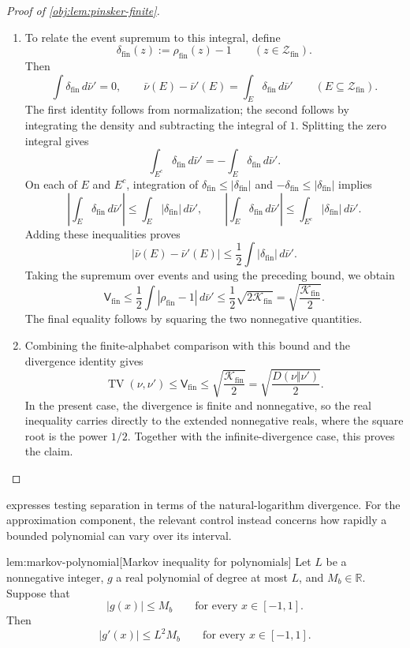 \documentclass[11pt]{article}
\begin{document}
\begin{proof}[Proof of \cref{obj:lem:pinsker-finite}]
\begin{enumerate}
\item To relate the event supremum to this integral, define
\[
\delta_{\mathrm{fin}}(z):=\rho_{\mathrm{fin}}(z)-1
\qquad(z\in\mathcal Z_{\mathrm{fin}}).
\]
Then
\[
\int\delta_{\mathrm{fin}}\,d\bar\nu'=0,
\qquad
\bar\nu(E)-\bar\nu'(E)
=\int_E\delta_{\mathrm{fin}}\,d\bar\nu'
\qquad(E\subseteq\mathcal Z_{\mathrm{fin}}).
\]
The first identity follows from normalization; the second follows by integrating the density and subtracting the integral of \(1\). Splitting the zero integral gives
\[
\int_{E^c}\delta_{\mathrm{fin}}\,d\bar\nu'
=-\int_E\delta_{\mathrm{fin}}\,d\bar\nu'.
\]
On each of \(E\) and \(E^c\), integration of
\(\delta_{\mathrm{fin}}\le|\delta_{\mathrm{fin}}|\) and
\(-\delta_{\mathrm{fin}}\le|\delta_{\mathrm{fin}}|\) implies
\[
\left|\int_E\delta_{\mathrm{fin}}\,d\bar\nu'\right|
\le\int_E|\delta_{\mathrm{fin}}|\,d\bar\nu',
\qquad
\left|\int_E\delta_{\mathrm{fin}}\,d\bar\nu'\right|
\le\int_{E^c}|\delta_{\mathrm{fin}}|\,d\bar\nu'.
\]
Adding these inequalities proves
\[
|\bar\nu(E)-\bar\nu'(E)|
\le\frac12\int|\delta_{\mathrm{fin}}|\,d\bar\nu'.
\]
Taking the supremum over events and using the preceding bound, we obtain
\[
\mathsf V_{\mathrm{fin}}
\le\frac12\int|\rho_{\mathrm{fin}}-1|\,d\bar\nu'
\le\frac12\sqrt{2\mathcal K_{\mathrm{fin}}}
=\sqrt{\frac{\mathcal K_{\mathrm{fin}}}{2}}.
\]
The final equality follows by squaring the two nonnegative quantities.

\item Combining the finite-alphabet comparison with this bound and the divergence identity gives
\[
\operatorname{TV}(\nu,\nu')
\le\mathsf V_{\mathrm{fin}}
\le\sqrt{\frac{\mathcal K_{\mathrm{fin}}}{2}}
=\sqrt{\frac{D(\nu\Vert\nu')}{2}}.
\]
In the present case, the divergence is finite and nonnegative, so the real inequality carries directly to the extended nonnegative reals, where the square root is the power \(1/2\). Together with the infinite-divergence case, this proves the claim.
\end{enumerate}
\end{proof}
\endgroup

 expresses testing separation in terms of the natural-logarithm divergence. For the approximation component, the relevant control instead concerns how rapidly a bounded polynomial can vary over its interval.

\begin{lemmav}{lem:markov-polynomial}[Markov inequality for polynomials]
Let \(L\) be a nonnegative integer, \(g\) a real polynomial of degree at most \(L\), and \(M_b\in\mathbb R\). Suppose that
\[
|g(x)|\le M_b \qquad \text{for every } x\in[-1,1].
\]
Then
\[
|g'(x)|\le L^2 M_b \qquad \text{for every } x\in[-1,1].
\]
\end{lemmav}
\end{document}

